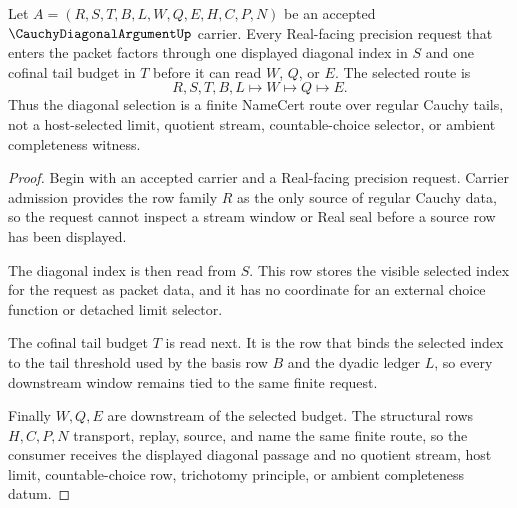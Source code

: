 \begin{theorem}
\label{thm:cauchy-diagonal-argument-tail-selection}
Let $A=(R,S,T,B,L,W,Q,E,H,C,P,N)$ be an accepted $\CauchyDiagonalArgumentUp$ carrier. Every Real-facing precision request that enters the packet factors through one displayed diagonal index in $S$ and one cofinal tail budget in $T$ before it can read $W$, $Q$, or $E$. The selected route is
$$
R,S,T,B,L \longmapsto W \longmapsto Q \longmapsto E .
$$
Thus the diagonal selection is a finite NameCert route over regular Cauchy tails, not a host-selected limit, quotient stream, countable-choice selector, or ambient completeness witness.
\end{theorem}
\begin{proof}
Begin with an accepted carrier and a Real-facing precision request. Carrier admission provides the row family $R$ as the only source of regular Cauchy data, so the request cannot inspect a stream window or Real seal before a source row has been displayed.

The diagonal index is then read from $S$. This row stores the visible selected index for the request as packet data, and it has no coordinate for an external choice function or detached limit selector.

The cofinal tail budget $T$ is read next. It is the row that binds the selected index to the tail threshold used by the basis row $B$ and the dyadic ledger $L$, so every downstream window remains tied to the same finite request.

Finally $W,Q,E$ are downstream of the selected budget. The structural rows $H,C,P,N$ transport, replay, source, and name the same finite route, so the consumer receives the displayed diagonal passage and no quotient stream, host limit, countable-choice row, trichotomy principle, or ambient completeness datum.
\end{proof}

